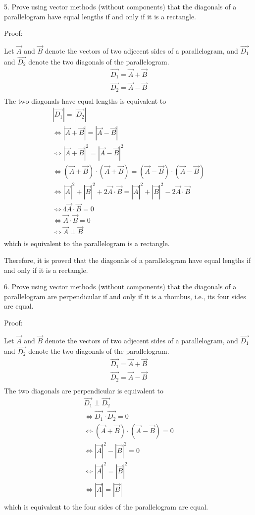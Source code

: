 \documentclass{article}
\begin{document}
5. Prove using vector methods (without components) that the diagonals of a
parallelogram have equal lengths if and only if it is a rectangle.

Proof:

Let $\vec{A}$ and $\vec{B}$ denote the vectors of two adjecent sides of a parallelogram,
and $\vec{D_1}$ and $\vec{D_2}$ denote the two diagonals of the parallelogram.
\begin{gather*}
  \vec{D_1} = \vec{A} + \vec{B} \\
  \vec{D_2} = \vec{A} - \vec{B} \\
\end{gather*}
The two diagonals have equal lengths is equivalent to
\begin{gather*}
  |\vec{D_1}| = |\vec{D_2}| \\
  \iff |\vec{A} + \vec{B}| = |\vec{A} - \vec{B}| \\
  \iff |\vec{A} + \vec{B}|^2 = |\vec{A} - \vec{B}|^2 \\
  \iff (\vec{A} + \vec{B}) \cdot (\vec{A} + \vec{B}) = (\vec{A} - \vec{B}) \cdot (\vec{A} - \vec{B}) \\
  \iff |\vec{A}|^2 + |\vec{B}|^2 + 2\vec{A} \cdot \vec{B} = |\vec{A}|^2 + |\vec{B}|^2 - 2\vec{A} \cdot \vec{B} \\
  \iff 4\vec{A} \cdot \vec{B} = 0 \\
  \iff \vec{A} \cdot \vec{B} = 0 \\
  \iff \vec{A} \perp \vec{B} \\
\end{gather*}
which is equivalent to the parallelogram is a rectangle.

Therefore, it is proved that the diagonals of a parallelogram have equal lengths 
if and only if it is a rectangle.

6. Prove using vector methods (without components) that the diagonals of a
parallelogram are perpendicular if and only if it is a rhombus, i.e., its four
sides are equal.

Proof:

Let $\vec{A}$ and $\vec{B}$ denote the vectors of two adjecent sides of a parallelogram,
and $\vec{D_1}$ and $\vec{D_2}$ denote the two diagonals of the parallelogram.
\begin{gather*}
  \vec{D_1} = \vec{A} + \vec{B} \\
  \vec{D_2} = \vec{A} - \vec{B} \\
\end{gather*}
The two diagonals are perpendicular is equivalent to 
\begin{gather*}
  \vec{D_1} \perp \vec{D_2} \\
  \iff \vec{D_1} \cdot \vec{D_2} = 0 \\
  \iff (\vec{A} + \vec{B}) \cdot (\vec{A} - \vec{B}) = 0 \\
  \iff |\vec{A}|^2 - |\vec{B}|^2 = 0 \\
  \iff |\vec{A}|^2 = |\vec{B}|^2 \\
  \iff |\vec{A}| = |\vec{B}| \\
\end{gather*}
which is equivalent to the four sides of the parallelogram are equal.
\end{document}
